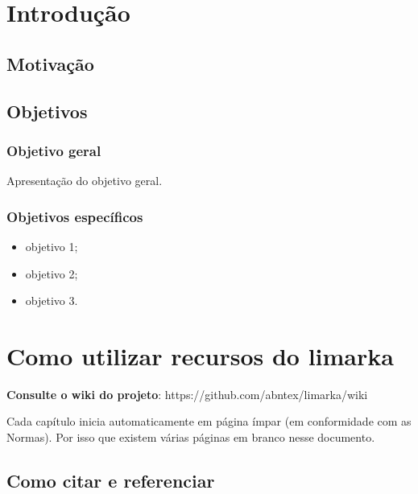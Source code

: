 \documentclass[
	12pt,				%
	oneside,			%
	a4paper,			%
	english,			%
	french,				%
	spanish,			%
	brazil				%
	]{abntex2}
\begin{document}
\hypertarget{introduuxe7uxe3o}{%
\chapter{Introdução}\label{introduuxe7uxe3o}}

\hypertarget{motivauxe7uxe3o}{%
\section{Motivação}\label{motivauxe7uxe3o}}

\hypertarget{objetivos}{%
\section{Objetivos}\label{objetivos}}

\hypertarget{objetivo-geral}{%
\subsection{Objetivo geral}\label{objetivo-geral}}

Apresentação do objetivo geral.

\hypertarget{objetivos-especuxedficos}{%
\subsection{Objetivos específicos}\label{objetivos-especuxedficos}}

\begin{itemize}
\tightlist
\item
  objetivo 1;
\item
  objetivo 2;
\item
  objetivo 3.
\end{itemize}

\hypertarget{como-utilizar-recursos-do-limarka}{%
\chapter{Como utilizar recursos do
limarka}\label{como-utilizar-recursos-do-limarka}}

\textbf{Consulte o wiki do projeto}:
https://github.com/abntex/limarka/wiki

Cada capítulo inicia automaticamente em página ímpar (em conformidade
com as Normas). Por isso que existem várias páginas em branco nesse
documento.

\hypertarget{como-citar-e-referenciar}{%
\section{Como citar e referenciar}\label{como-citar-e-referenciar}}
\end{document}
